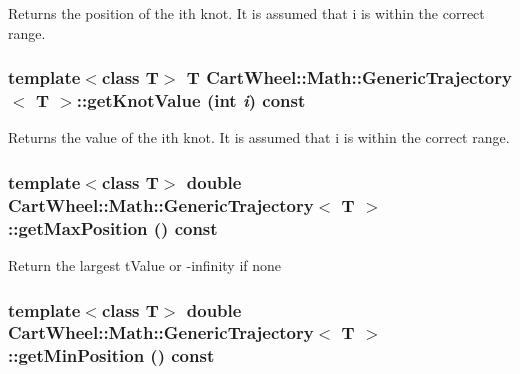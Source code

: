 \label{classCartWheel_1_1Math_1_1GenericTrajectory_a47285d1ca68a26683656aba3f8ddde9d}
Returns the position of the ith knot. It is assumed that i is within the correct range. \hypertarget{classCartWheel_1_1Math_1_1GenericTrajectory_a417e8fa352c64d1758d792b9b78336a3}{
\subsubsection[{getKnotValue}]{\setlength{\rightskip}{0pt plus 5cm}template$<$class T$>$ T {\bf CartWheel::Math::GenericTrajectory}$<$ T $>$::getKnotValue (int {\em i}) const}}
\label{classCartWheel_1_1Math_1_1GenericTrajectory_a417e8fa352c64d1758d792b9b78336a3}
Returns the value of the ith knot. It is assumed that i is within the correct range. \hypertarget{classCartWheel_1_1Math_1_1GenericTrajectory_a244f5f4bd634ddedf127df75f904fe98}{
\subsubsection[{getMaxPosition}]{\setlength{\rightskip}{0pt plus 5cm}template$<$class T$>$ double {\bf CartWheel::Math::GenericTrajectory}$<$ T $>$::getMaxPosition () const}}
\label{classCartWheel_1_1Math_1_1GenericTrajectory_a244f5f4bd634ddedf127df75f904fe98}
Return the largest tValue or -\/infinity if none \hypertarget{classCartWheel_1_1Math_1_1GenericTrajectory_ab99de22b373b37caabf9dcaaf6838aca}{
\subsubsection[{getMinPosition}]{\setlength{\rightskip}{0pt plus 5cm}template$<$class T$>$ double {\bf CartWheel::Math::GenericTrajectory}$<$ T $>$::getMinPosition () const}}
